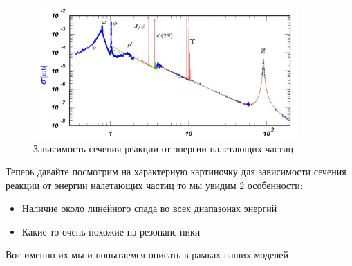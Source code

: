 \documentclass[12pt]{article}
\begin{document}
\begin{figure}[h]
    \centering
    \includegraphics[width=0.9\textwidth,height=\textheight,keepaspectratio]{Seminar_10/pics/pic_02_barn.PNG}
    \caption{Зависимость сечения реакции от энергии налетающих частиц}
    \label{fig:sem_10_barn}
\end{figure}

Теперь давайте посмотрим на характерную картиночку для зависимости сечения реакции от энергии налетающих частиц то мы увидим 2 особенности:
\begin{itemize}
    \item Наличие около линейного спада во всех диапазонах энергий
    \item Какие-то очень похожие на резонанс пики
\end{itemize}
Вот именно их мы и попытаемся описать в рамках наших моделей
\end{document}
